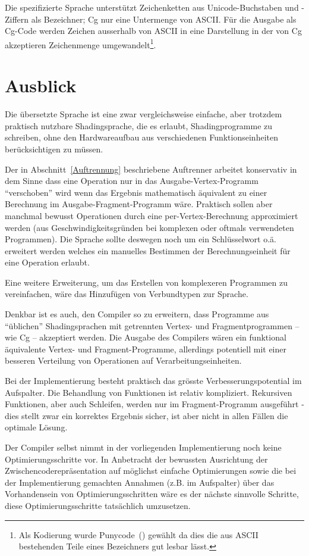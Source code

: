 \documentclass[twoside,a4paper,fleqn,12pt]{article}
\begin{document}
Die spezifizierte Sprache unterstützt Zeichenketten aus Unicode-Buchstaben und -Ziffern als Bezeichner;
Cg nur eine Untermenge von ASCII. Für die Ausgabe als Cg-Code werden Zeichen ausserhalb von ASCII in eine Darstellung in der von Cg akzeptieren
Zeichenmenge umgewandelt\footnote{Als Kodierung wurde Punycode~(\cite{rfc3492}) gewählt da dies die aus ASCII bestehenden Teile eines Bezeichners
gut lesbar lässt.}.


\section{Ausblick}


Die übersetzte Sprache ist eine zwar vergleichsweise einfache, aber trotzdem praktisch nutzbare
Shadingsprache, die es erlaubt, Shadingprogramme zu schreiben, ohne den Hardwareaufbau aus verschiedenen Funktionseinheiten
berücksichtigen zu müssen.

Der in Abschnitt~\ref{Auftrennung} beschriebene Auftrenner arbeitet konservativ in dem Sinne dass eine Operation nur in das Ausgabe-Vertex-Programm
"`verschoben"' wird wenn das Ergebnis mathematisch äquivalent zu einer Berechnung im Ausgabe-Fragment-Programm wäre.
Praktisch sollen aber manchmal bewusst Operationen durch eine per-Vertex-Berechnung approximiert werden (aus Geschwindigkeitsgründen
bei komplexen oder oftmals verwendeten Programmen). Die Sprache sollte deswegen noch um ein Schlüsselwort o.ä. erweitert werden
welches ein manuelles Bestimmen der Berechnungseinheit für eine Operation erlaubt.

Eine weitere Erweiterung, um das Erstellen von komplexeren Programmen zu vereinfachen, wäre das Hinzufügen von Verbundtypen zur Sprache.

Denkbar ist es auch, den Compiler so zu erweitern, dass Programme aus "`üblichen"' Shadingsprachen mit getrennten Vertex- und Fragmentprogrammen
-- wie Cg -- akzeptiert werden. Die Ausgabe des Compilers wären ein funktional äquivalente Vertex- und Fragment-Programme,
allerdings potentiell mit einer besseren Verteilung von Operationen auf Verarbeitungseinheiten.

Bei der Implementierung besteht praktisch das grösste Verbesserungspotential im Aufspalter. Die Behandlung von Funktionen ist relativ
kompliziert. Rekursiven Funktionen, aber auch Schleifen, werden nur im Fragment-Programm ausgeführt - dies stellt zwar ein korrektes
Ergebnis sicher, ist aber nicht in allen Fällen die optimale Lösung.

Der Compiler selbst nimmt in der vorliegenden Implementierung noch keine Optimierungsschritte vor. In Anbetracht der bewussten Ausrichtung
der Zwischencoderepräsentation auf möglichst einfache Optimierungen sowie die bei der Implementierung gemachten Annahmen (z.B. im Aufspalter) über das
Vorhandensein von Optimierungsschritten wäre es der nächste sinnvolle Schritte, diese Optimierungsschritte tatsächlich umzusetzen.

\cleardoublepage
\appendix

\end{document}
